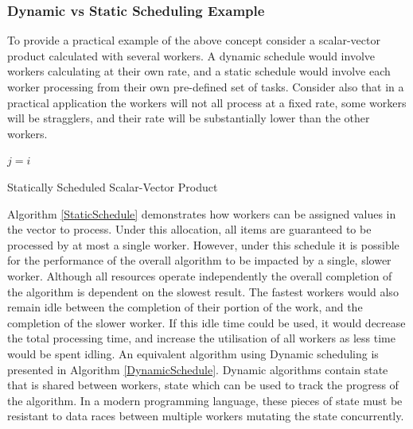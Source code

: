 \documentclass[12pt]{article}
\begin{document}
\subsubsection{Dynamic vs Static Scheduling Example}

To provide a practical example of the above concept consider a scalar-vector product calculated with several workers. A dynamic schedule would involve workers calculating at their own rate, and a static schedule would involve each worker processing from their own pre-defined set of tasks. Consider also that in a practical application the workers will not all process at a fixed rate, some workers will be stragglers, and their rate will be substantially lower than the other workers.

\IncMargin{1em}
\begin{algorithm}[H]
 \BlankLine

 $j = i$\;
 \caption{Statically Scheduled Scalar-Vector Product}
 \label{StaticSchedule}
\end{algorithm}
\DecMargin{1em}
\medskip

Algorithm \ref{StaticSchedule} demonstrates how workers can be assigned values in the vector to process. Under this allocation, all items are guaranteed to be processed by at most a single worker. However, under this schedule it is possible for the performance of the overall algorithm to be impacted by a single, slower worker. Although all resources operate independently the overall completion of the algorithm is dependent on the slowest result. The fastest workers would also remain idle between the completion of their portion of the work, and the completion of the slower worker. If this idle time could be used, it would decrease the total processing time, and increase the utilisation of all workers as less time would be spent idling.
\newline
\newline
An equivalent algorithm using Dynamic scheduling is presented in Algorithm \ref{DynamicSchedule}. Dynamic algorithms contain state that is shared between workers, state which can be used to track the progress of the algorithm. In a modern programming language, these pieces of state must be resistant to data races between multiple workers mutating the state concurrently.
\end{document}
